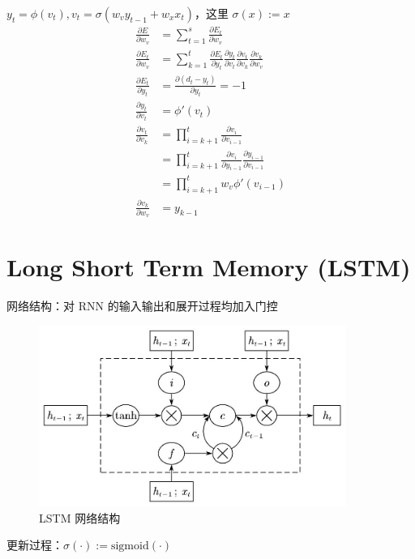 \documentclass[openany]{ctexbook}
\theoremstyle{kaiti}
\theoremstyle{normal}
\begin{document}
$y_t=\phi \left(v_t \right), v_t=\sigma \left(w_vy_{t-1}+w_xx_t \right)$，这里 $\sigma (x):=x$
\begin{equation}
\begin{aligned}
  \frac{\partial E}{\partial w_v}&=\sum_{t=1}^s{\frac{\partial E_t}{\partial w_v}} \\
  \frac{\partial E_t}{\partial w_v}&=\sum_{k=1}^t{\frac{\partial E_t}{\partial y_t}\frac{\partial y_t}{\partial v_t}\frac{\partial v_t}{\partial v_k}\frac{\partial v_k}{\partial w_v}}\\
  \frac{\partial E_t}{\partial y_t}&=\frac{\partial \left(d_t-y_t \right)}{\partial y_t}=-1 \\
  \frac{\partial y_t}{\partial v_t}&=\phi '\left(v_t \right) \\
  \frac{\partial v_t}{\partial v_k}
  &=\prod_{i=k+1}^t{\frac{\partial v_i}{\partial v_{i-1}}}\\
  &=\prod_{i=k+1}^t{\frac{\partial v_i}{\partial y_{i-1}}\frac{\partial y_{i-1}}{\partial v_{i-1}}}\\
  &=\prod_{i=k+1}^t{w_v\phi '\left(v_{i-1} \right)}\\
  \frac{\partial v_k}{\partial w_v}&=y_{k-1}
\end{aligned}
\end{equation}

\section{Long Short Term Memory (LSTM)}

网络结构：对 RNN 的输入输出和展开过程均加入门控

\begin{figure}
  \centering
  \includegraphics[width=10cm]{1627808642695-8.4.jpg}
  \caption{LSTM 网络结构}
\end{figure}

更新过程：$\sigma \left(\cdot \right):=\mathrm{sigmoid}\left(\cdot \right)$
\end{document}
